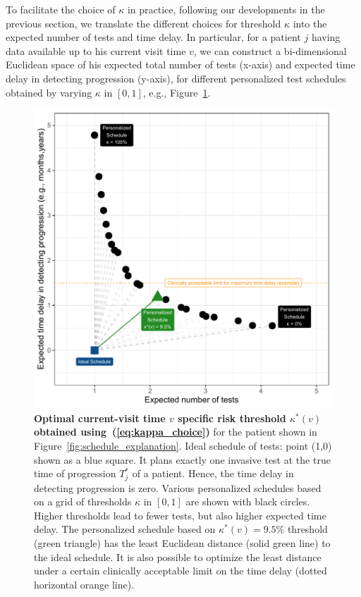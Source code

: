 To facilitate the choice of $\kappa$ in practice, following our developments in the previous section, we translate the different choices for threshold $\kappa$ into the expected number of tests and time delay. In particular, for a patient $j$ having data available up to his current visit time $v$, we can construct a bi-dimensional Euclidean space of his expected total number of tests (x-axis) and expected time delay in detecting progression (y-axis), for different personalized test schedules obtained by varying $\kappa$ in $[0, 1]$, e.g., Figure~\ref{fig:kappa_choice}.
\begin{figure}
\centerline{\includegraphics{images/kappa_choice_102.pdf}}
\caption{\small{\textbf{Optimal current-visit time $v$ specific risk threshold $\kappa^*(v)$ obtained using~(\ref{eq:kappa_choice})} for the patient shown in Figure~\ref{fig:schedule_explanation}. Ideal schedule of tests: point (1,0) shown as a blue square. It plans exactly one invasive test at the true time of progression $T^*_j$ of a patient. Hence, the time delay in detecting progression is zero. Various personalized schedules based on a grid of thresholds $\kappa$ in $[0,1]$ are shown with black circles. Higher thresholds lead to fewer tests, but also higher expected time delay. The personalized schedule based on $\kappa^*(v)=9.5\%$ threshold (green triangle) has the least Euclidean distance (solid green line) to the ideal schedule. It is also possible to optimize the least distance under a certain clinically acceptable limit on the time delay (dotted horizontal orange line).}}
\label{fig:kappa_choice}
\end{figure}

